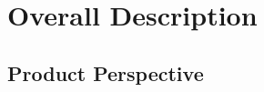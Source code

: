 \documentclass{scrreprt}
\begin{document}


\chapter{Overall Description}

\section{Product Perspective}
\end{document}
